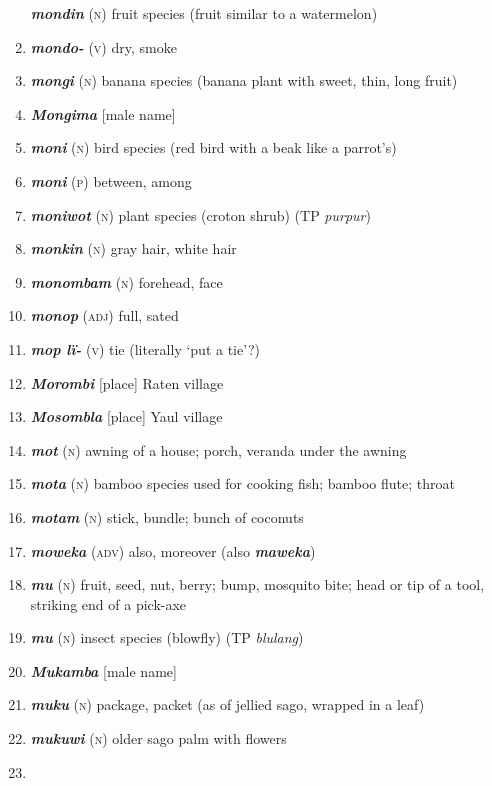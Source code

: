 \begin{enumerate}[noitemsep, label={}, align=left, widest=190, labelsep=1ex,leftmargin=*,itemindent=-10pt]
\textbf{\textit{mondin}} (\textsc{n}) fruit species (fruit similar to a watermelon) \item 
\textbf{\textit{mondo-}} (\textsc{v}) dry, smoke \item 
\textbf{\textit{mongi}} (\textsc{n}) banana species (banana plant with sweet, thin, long fruit) \item 
\textbf{\textit{Mongima}} [male name] \item 
\textbf{\textit{moni}} (\textsc{n}) bird species (red bird with a beak like a parrot’s) \item 
\textbf{\textit{moni}} (\textsc{p}) between, among \item 
\textbf{\textit{moniwot}} (\textsc{n}) plant species (croton shrub) (TP \textit{purpur}) \item 
\textbf{\textit{monkin}} (\textsc{n}) gray hair, white hair \item 
\textbf{\textit{monombam}} (\textsc{n}) forehead, face \item 
\textbf{\textit{monop}} (\textsc{adj}) full, sated \item 
\textbf{\textit{mop lï-}} (\textsc{v}) tie (literally ‘put a tie’?) \item 
\textbf{\textit{Morombi}} [place] Raten village \item 
\textbf{\textit{Mosombla}} [place] Yaul village \item 
\textbf{\textit{mot}} (\textsc{n}) awning of a house; porch, veranda under the awning \item 
\textbf{\textit{mota}} (\textsc{n}) bamboo species used for cooking fish; bamboo flute; throat \item 
\textbf{\textit{motam}} (\textsc{n}) stick, bundle; bunch of coconuts \item 
\textbf{\textit{moweka}} (\textsc{adv)} also, moreover (also \textbf{\textit{maweka}}) \item 
\textbf{\textit{mu}} (\textsc{n}) fruit, seed, nut, berry; bump, mosquito bite; head or tip of a tool, striking end of a pick-axe \item 
\textbf{\textit{mu}} (\textsc{n}) insect species (blowfly) (TP \textit{blulang}) \item 
\textbf{\textit{Mukamba}} [male name] \item 
\textbf{\textit{muku}} (\textsc{n}) package, packet (as of jellied sago, wrapped in a leaf) \item 
\textbf{\textit{mukuwi}} (\textsc{n}) older sago palm with flowers \item 

\end{enumerate}

